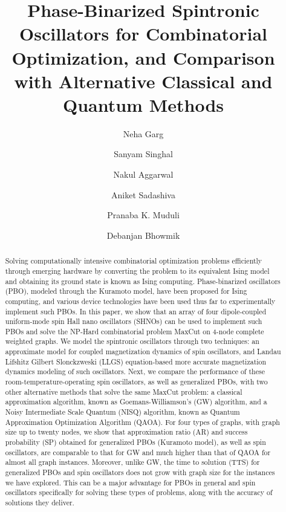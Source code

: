 \documentclass[10pt]{article}
\title{Phase-Binarized Spintronic Oscillators for Combinatorial Optimization, and Comparison with Alternative Classical and Quantum Methods}
\author[1]{Neha Garg}
\author[2]{Sanyam Singhal}
\author[3]{Nakul Aggarwal}
\author[4]{Aniket Sadashiva}
\author[1]{Pranaba K. Muduli}
\author[4]{Debanjan Bhowmik}
\affil[1]{Department of Physics, Indian Institute of Technology Delhi}
\affil[2]{Department of Physics, Indian Institute of Technology Bombay}
\affil[3]{Department of Physics, University of Alberta, Canada}
\affil[4]{Department of Electrical Engineering, Indian Institute of Technology Bombay}
\date{}
\begin{document}
\maketitle










\begin{abstract}
Solving computationally intensive combinatorial optimization problems efficiently through emerging hardware by converting the problem to its equivalent Ising model and obtaining its ground state is known as Ising computing. Phase-binarized oscillators (PBO), modeled through the Kuramoto model, have been proposed for Ising computing, and various device technologies have been used thus far to experimentally implement such PBOs. In this paper, we show that an array of four dipole-coupled uniform-mode spin Hall nano oscillators (SHNOs) can be used to implement such PBOs and solve the NP-Hard combinatorial problem MaxCut on 4-node complete weighted graphs. We model the spintronic oscillators through two techniques: an approximate model for coupled magnetization dynamics of spin oscillators, and Landau Lifshitz Gilbert Slonckzweski (LLGS) equation-based more accurate magnetization dynamics modeling of such oscillators. Next, we compare the performance of these room-temperature-operating spin oscillators, as well as generalized PBOs, with two other alternative methods that solve the same MaxCut problem: a classical approximation algorithm, known as Goemans-Williamson's (GW) algorithm, and a Noisy Intermediate Scale Quantum (NISQ) algorithm, known as Quantum Approximation Optimization Algorithm (QAOA). For four types of graphs, with graph size up to twenty nodes, we show that approximation ratio (AR) and success probability (SP) obtained for generalized PBOs (Kuramoto model), as well as spin oscillators, are comparable to that for GW and much higher than that of QAOA for almost all graph instances. Moreover, unlike GW, the time to solution (TTS) for generalized PBOs and spin oscillators does not grow with graph size for the instances we have explored. This can be a major advantage for PBOs in general and spin oscillators specifically for solving these types of problems, along with the accuracy of solutions they deliver.  
\end{abstract}
\end{document}
